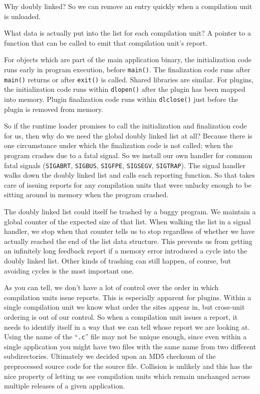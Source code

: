 \documentclass[10pt,twocolumn]{article}
\begin{document}
Why doubly linked?  So we can remove an entry quickly when a
compilation unit is unloaded.

What data is actually put into the list for each compilation unit?  A
pointer to a function that can be called to emit that compilation
unit's report.

For objects which are part of the main application binary, the
initialization code runs early in program execution, before
\texttt{main()}.  The finalization code runs after \texttt{main()}
returns or after \texttt{exit()} is called.  Shared libraries are
similar.  For plugins, the initialization code runs within
\texttt{dlopen()} after the plugin has been mapped into memory.
Plugin finalization code runs within \texttt{dlclose()} just before
the plugin is removed from memory.

So if the runtime loader promises to call the initialization and
finalization code for us, then why do we need the global doubly linked
list at all?  Because there is one circumstance under which the
finalization code is not called: when the program crashes due to a
fatal signal.  So we install our own handler for common fatal signals
(\texttt{SIGABRT}, \texttt{SIGBUS}, \texttt{SIGFPE}, \texttt{SIGSEGV},
\texttt{SIGTRAP}).  The signal handler walks down the doubly linked
list and calls each reporting function.  So that takes care of issuing
reports for any compilation units that were unlucky enough to be
sitting around in memory when the program crashed.

The doubly linked list could itself be trashed by a buggy program.  We
maintain a global counter of the expected size of that list.  When
walking the list in a signal handler, we stop when that counter tells
us to stop regardless of whether we have actually reached the end of
the list data structure.  This prevents us from getting an infinitely
long feedback report if a memory error introduced a cycle into the
doubly linked list.  Other kinds of trashing can still happen, of
course, but avoiding cycles is the most important one.

As you can tell, we don't have a lot of control over the order in
which compilation units issue reports.  This is especially apparent
for plugins.  Within a single compilation unit we know what order the
sites appear in, but cross-unit ordering is out of our control.  So
when a compilation unit issues a report, it needs to identify itself
in a way that we can tell whose report we are looking at.  Using the
name of the ``\texttt{.c}'' file may not be unique enough, since even
within a single application you might have two files with the same
name from two different subdirectories.  Ultimately we decided upon an
MD5 checksum of the preprocessed source code for the source file.
Collision is unlikely and this has the nice property of letting us see
compilation units which remain unchanged across multiple releases of a
given application.
\end{document}

